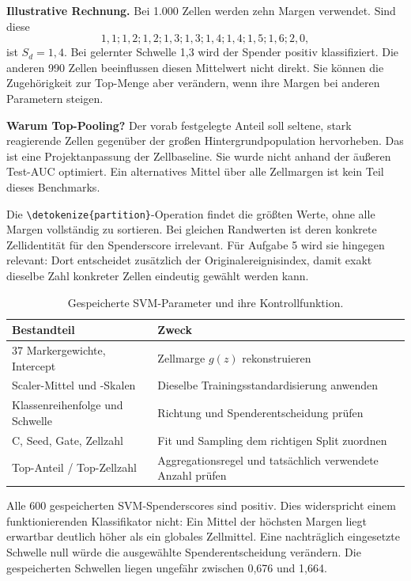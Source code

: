 \documentclass[11pt,a4paper]{article}
\newcommand{\code}[1]{\expandafter\nolinkurl\expandafter{\detokenize{#1}}}
\begin{document}
\textbf{Illustrative Rechnung.} Bei 1.000 Zellen werden zehn Margen
verwendet. Sind diese
\[1{,}1;1{,}2;1{,}2;1{,}3;1{,}3;1{,}4;1{,}4;1{,}5;1{,}6;2{,}0,\]
ist \(S_d=1{,}4\). Bei gelernter Schwelle 1,3 wird der Spender positiv
klassifiziert. Die anderen 990 Zellen beeinflussen diesen Mittelwert
nicht direkt. Sie können die Zugehörigkeit zur Top-Menge aber verändern,
wenn ihre Margen bei anderen Parametern steigen.

\textbf{Warum Top-Pooling?} Der vorab festgelegte Anteil soll seltene,
stark reagierende Zellen gegenüber der großen Hintergrundpopulation
hervorheben. Das ist eine Projektanpassung der Zellbaseline. Sie wurde
nicht anhand der äußeren Test-AUC optimiert. Ein alternatives Mittel über
alle Zellmargen ist kein Teil dieses Benchmarks.

Die \code{partition}-Operation findet die größten Werte, ohne alle Margen
vollständig zu sortieren. Bei gleichen Randwerten ist deren konkrete
Zellidentität für den Spenderscore irrelevant. Für Aufgabe 5 wird sie
hingegen relevant: Dort entscheidet zusätzlich der Originalereignisindex,
damit exakt dieselbe Zahl konkreter Zellen eindeutig gewählt werden kann.

\begin{table}[!ht]\centering\small
\caption{Gespeicherte SVM-Parameter und ihre Kontrollfunktion.}
\begin{tabular}{p{5cm}p{10cm}}\toprule
Bestandteil & Zweck\\\midrule
37 Markergewichte, Intercept & Zellmarge \(g(z)\) rekonstruieren\\
Scaler-Mittel und -Skalen & Dieselbe Trainingsstandardisierung anwenden\\
Klassenreihenfolge und Schwelle & Richtung und Spenderentscheidung prüfen\\
C, Seed, Gate, Zellzahl & Fit und Sampling dem richtigen Split zuordnen\\
Top-Anteil / Top-Zellzahl & Aggregationsregel und tatsächlich verwendete Anzahl prüfen\\
\bottomrule\end{tabular}
\end{table}

Alle 600 gespeicherten SVM-Spenderscores sind positiv. Dies widerspricht
einem funktionierenden Klassifikator nicht: Ein Mittel der höchsten Margen
liegt erwartbar deutlich höher als ein globales Zellmittel. Eine
nachträglich eingesetzte Schwelle null würde die ausgewählte
Spenderentscheidung verändern. Die gespeicherten Schwellen liegen
ungefähr zwischen 0,676 und 1,664.
\end{document}
